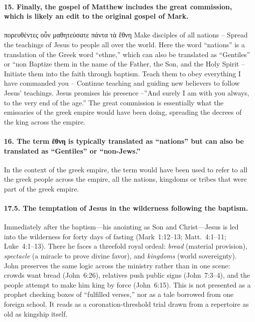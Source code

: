 \paragraph{15.
Finally, the gospel of Matthew includes the great commission, which is likely an edit to the original gospel of Mark.}\label{par:finally-the-gospel-of-matthew-includes-the-great-commission-which-is-likely-an-edit-to-the-original-gospel-of-mark.}

πορευθέντες οὖν μαθητεύσατε πάντα τὰ ἔθνη Make disciples of all nations -- Spread the teachings of Jesus to people all over the world.
Here the word ``nations'' is a translation of the Greek word ``ethne,'' which can also be translated as ``Gentiles'' or ``non Baptize them in the name of the Father, the Son, and the Holy Spirit -- Initiate them into the faith through baptism.
Teach them to obey everything I have commanded you -- Continue teaching and guiding new believers to follow Jesus' teachings.
Jesus promises his presence --''And surely I am with you always, to the very end of the age.'' The great commission is essentially what the emissaries of the greek empire would have been doing, spreading the decrees of the king across the empire.

\paragraph{16.
The term ἔθνη is typically translated as ``nations'' but can also be translated as ``Gentiles'' or ``non-Jews.''}\label{par:the-term-ux1f14ux3b8ux3bdux3b7-is-typically-translated-as-nations-but-can-also-be-translated-as-gentiles-or-non-jews.}

In the context of the greek empire, the term would have been used to refer to all the greek people across the empire, all the nations, kingdoms or tribes that were part of the greek empire.

\paragraph{17.5.
The temptation of Jesus in the wilderness following the baptism.}\label{par:the-temptation-of-jesus-in-the-wilderness-following-the-baptism.}

Immediately after the baptism---his anointing as Son and Christ---Jesus is led into the wilderness for forty days of fasting (Mark~1:12--13; Matt.~4:1--11; Luke~4:1--13).
There he faces a threefold royal ordeal: \emph{bread} (material provision), \emph{spectacle} (a miracle to prove divine favor), and \emph{kingdoms} (world sovereignty).
John preserves the same logic across the ministry rather than in one scene: crowds want bread (John~6:26), relatives push public signs (John~7:3--4), and the people attempt to make him king by force (John~6:15).
This is not presented as a prophet checking boxes of “fulfilled verses,” nor as a tale borrowed from one foreign school.
It reads as a coronation‐threshold trial drawn from a repertoire as old as kingship itself.

